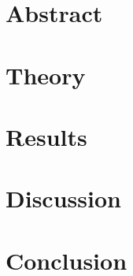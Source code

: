 \documentclass[EEEE]{KGCOEReport}
\begin{document}
\maketitle

\section*{Abstract}

\section*{Theory}

\section*{Results}

\section*{Discussion}

\section*{Conclusion}
\end{document}
